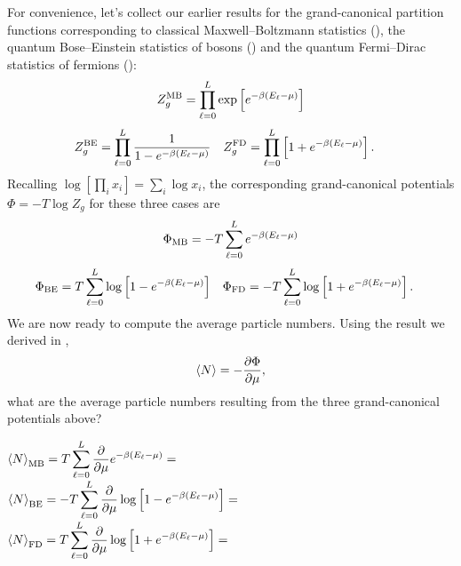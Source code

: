 For convenience, let's collect our earlier results for the grand-canonical partition functions corresponding to classical Maxwell--Boltzmann statistics (), the quantum Bose--Einstein statistics of bosons () and the quantum Fermi--Dirac statistics of fermions ():
\begin{equation*}
  Z_g^{\text{MB}} = \prod_{\ell = 0}^L \exp\left[e^{-\beta\left(E_{\ell} - \mu\right)}\right]
\end{equation*}
\begin{align*}
  Z_g^{\text{BE}} & = \prod_{\ell = 0}^L \frac{1}{1 - e^{-\beta (E_{\ell} - \mu)}} &
  Z_g^{\text{FD}} & = \prod_{\ell = 0}^L \left[1 + e^{-\beta (E_{\ell} - \mu)}\right].
\end{align*}
Recalling $\log\left[\prod_i x_i\right] = \sum_i \log x_i$, the corresponding grand-canonical potentials $\Phi = -T \log Z_g$ for these three cases are
\begin{equation*}
  \Phi_{\text{MB}} = -T \sum_{\ell = 0}^L e^{-\beta\left(E_{\ell} - \mu\right)}
\end{equation*}
\begin{align*}
  \Phi_{\text{BE}} & =  T \sum_{\ell = 0}^L \log\left[1 - e^{-\beta (E_{\ell} - \mu)}\right] &
  \Phi_{\text{FD}} & = -T \sum_{\ell = 0}^L \log\left[1 + e^{-\beta (E_{\ell} - \mu)}\right].
\end{align*}
We are now ready to compute the average particle numbers.
Using the result we derived in ,
\begin{equation*}
  \left\langle N \right\rangle = -\frac{\partial \Phi}{\partial \mu},
\end{equation*}
what are the average particle numbers resulting from the three grand-canonical potentials above?
\begin{mdframed}
  $\displaystyle \left\langle N \right\rangle_{\text{MB}} =  T \sum_{\ell = 0}^L \frac{\partial }{\partial \mu} e^{-\beta\left(E_{\ell} - \mu\right)} = $ \\[100 pt]
  $\displaystyle \left\langle N \right\rangle_{\text{BE}} = -T \sum_{\ell = 0}^L \frac{\partial }{\partial \mu} \log\left[1 - e^{-\beta (E_{\ell} - \mu)}\right] = $ \\[100 pt]
  $\displaystyle \left\langle N \right\rangle_{\text{FD}} =  T \sum_{\ell = 0}^L \frac{\partial }{\partial \mu} \log\left[1 + e^{-\beta (E_{\ell} - \mu)}\right] = $ \\[100 pt]
\end{mdframed}

